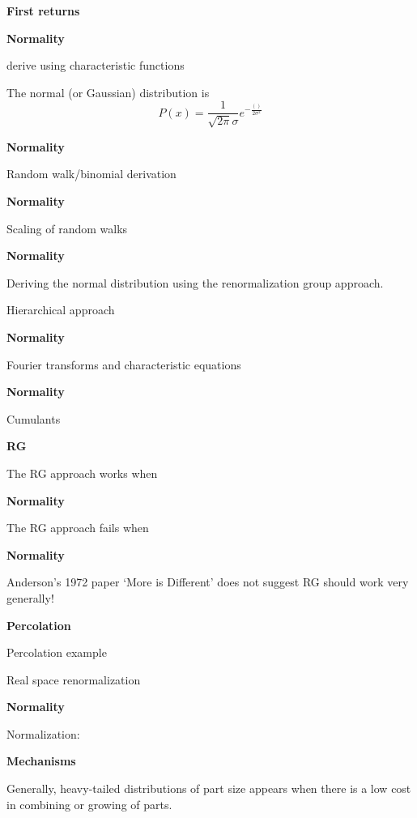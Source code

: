   \textbf{First returns}



  \textbf{Normality}

derive using characteristic functions

The normal (or Gaussian) distribution is
$$
P(x) 
=
\frac{1}{\sqrt{2\pi}\sigma}
e^{-\frac{()}{2\sigma^2}}
$$


  \textbf{Normality}

Random walk/binomial derivation



  \textbf{Normality}

Scaling of random walks


  \textbf{Normality}

Deriving the normal distribution using 
the renormalization group approach.

Hierarchical approach


  \textbf{Normality}

Fourier transforms and
characteristic equations


  \textbf{Normality}

Cumulants


  \textbf{RG}

The RG approach works when


  \textbf{Normality}

The RG approach fails when


  \textbf{Normality}

Anderson's 1972 paper `More is Different'
does not suggest RG should work 
very generally!



  \textbf{Percolation}

Percolation example

Real space renormalization


  \textbf{Normality}

Normalization:






  \textbf{Mechanisms}

Generally, heavy-tailed distributions of
part size appears when there is a low cost in combining or growing
of parts.



